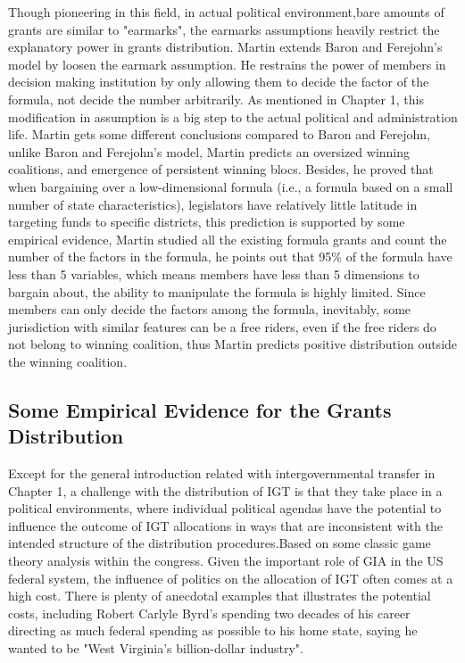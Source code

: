 Though pioneering in this field, in actual political environment,bare amounts of grants are similar to "earmarks", the earmarks assumptions heavily restrict the explanatory power in grants distribution. Martin \cite{martin2018dividing} extends Baron and Ferejohn's model by loosen the earmark assumption. He restrains the power of members in decision making institution by only allowing them to decide the factor of the formula, not decide the number arbitrarily. As mentioned in Chapter 1, this modification in assumption is a big step to the actual political and administration life. Martin gets some different conclusions compared to Baron and Ferejohn, unlike Baron and Ferejohn’s model, Martin predicts an oversized winning coalitions, and emergence of persistent winning blocs. Besides, he proved that when bargaining over a low-dimensional formula (i.e., a formula based on a small number of state characteristics), legislators have relatively little latitude in targeting funds to specific districts, this prediction is supported by some empirical evidence, Martin studied all the existing formula grants and count the number of the factors in the formula, he points out that 95\% of the formula have less than 5 variables, which means members have less than 5 dimensions to bargain about, the ability to manipulate the formula is highly limited. Since members can only decide the factors among the formula, inevitably, some jurisdiction with similar features can be a free riders, even if the free riders do not belong to winning coalition, thus Martin predicts positive distribution outside the winning coalition.

\subsection{Some Empirical Evidence for the Grants Distribution}
Except for the general introduction related with intergovernmental transfer in Chapter 1, a challenge with the distribution of IGT is that they take place in a political environments, where individual political agendas have the potential to influence the outcome of IGT allocations in ways that are inconsistent with the intended structure of the distribution procedures.Based on some classic game theory analysis within the congress. Given the important role of GIA in the US federal system, the influence of politics on the allocation of IGT often comes at a high cost. There is plenty of anecdotal examples that illustrates the potential costs, including Robert Carlyle Byrd's spending two decades of his career directing as much federal spending as possible to his home state, saying he wanted to be "West Virginia's billion-dollar industry".

